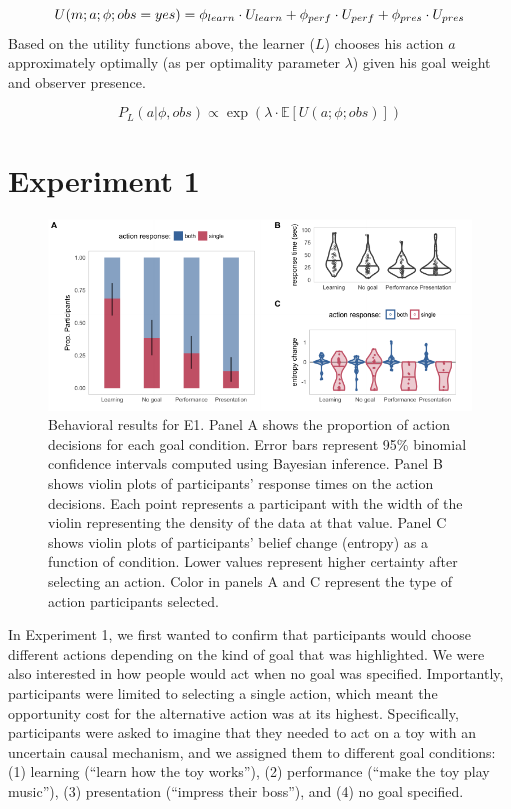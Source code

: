 \documentclass[10pt, letterpaper]{article}
\newenvironment{CodeChunk}{}{}
\begin{document}
\[ U(m;a;\phi; obs = yes) = \phi_{learn} \cdot U_{learn} + \\ \phi_{perf} \cdot U_{perf} + \phi_{pres} \cdot U_{pres}\]
Based on the utility functions above, the learner (\(L\)) chooses his
action \(a\) approximately optimally (as per optimality parameter
\(\lambda\)) given his goal weight and observer presence.

\[ P_L(a | \phi, obs) \propto \exp(\lambda \cdot \mathbb{E}[U(a;\phi; obs)])\]

\section{Experiment 1}\label{experiment-1}

\begin{CodeChunk}
\begin{figure}[tb]

{\centering \includegraphics[width=0.95\linewidth]{figs/e1_behav_results_plot-1} 

}

\caption[Behavioral results for E1]{Behavioral results for E1. Panel A shows the proportion of action decisions for each goal condition. Error bars represent 95\% binomial confidence intervals computed using Bayesian inference. Panel B shows violin plots of participants' response times on the action decisions. Each point represents a participant with the width of the violin representing the density of the data at that value. Panel C shows violin plots of participants' belief change (entropy) as a function of condition. Lower values represent higher certainty after selecting an action. Color in panels A and C represent the type of action participants selected.}\label{fig:e1_behav_results_plot}
\end{figure}
\end{CodeChunk}

In Experiment 1, we first wanted to confirm that participants would
choose different actions depending on the kind of goal that was
highlighted. We were also interested in how people would act when no
goal was specified. Importantly, participants were limited to selecting
a single action, which meant the opportunity cost for the alternative
action was at its highest. Specifically, participants were asked to
imagine that they needed to act on a toy with an uncertain causal
mechanism, and we assigned them to different goal conditions: (1)
learning (``learn how the toy works''), (2) performance (``make the toy
play music''), (3) presentation (``impress their boss''), and (4) no
goal specified.
\end{document}
